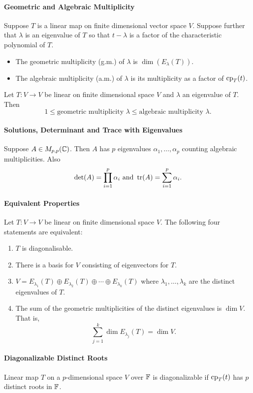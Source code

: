 \paragraph{Geometric and Algebraic Multiplicity}
Suppose \(T\) is a linear map on finite dimensional vector space \(V\). Suppose further that \(\lambda\) is an eigenvalue of \(T\) so that \(t - \lambda\) is a factor of the characteristic polynomial of \(T\). 
\begin{itemize}
    \item The geometric multiplicity (g.m.) of \(\lambda\) is \(\dim(E_\lambda(T))\).
    \item The algebraic multiplicity (a.m.) of \(\lambda\) is its multiplicity as a factor of \(\mathrm{cp}_T(t)\).
\end{itemize}
Let \(T: V \to V\) be linear on finite dimensional space \(V\) and \(\lambda\) an eigenvalue of \(T\). Then
\[1 \leq \text{geometric multiplicity } \lambda \leq \text{algebraic multiplicity } \lambda.\]

\paragraph{Solutions, Determinant and Trace with Eigenvalues}
Suppose \(A \in M_{p,p}(\mathbb{C})\). Then \(A\) has \(p\) eigenvalues \(\alpha_1, \dots, \alpha_p\) counting algebraic multiplicities. Also
\[\det(A) = \prod_{i=1}^p \alpha_i \text{ and } \tr(A) = \sum_{i=1}^p \alpha_i.\]

\paragraph{Equivalent Properties}
Let \(T: V \to V\) be linear on finite dimensional space \(V\). The following four statements are equivalent:
\begin{enumerate}
    \item \(T\) is diagonalisable.
    \item There is a basis for \(V\) consisting of eigenvectors for \(T\).
    \item \(V = E_{\lambda_1}(T) \oplus E_{\lambda_2}(T) \oplus \cdots \oplus E_{\lambda_k}(T)\) where \(\lambda_1, \dots, \lambda_k\) are the distinct eigenvalues of \(T\).
    \item The sum of the geometric multiplicities of the distinct eigenvalues is \(\dim V\). That is,
    \[\sum_{j=1}^k \dim E_{\lambda_j}(T) = \dim V.\]
\end{enumerate}

\paragraph{Diagonalizable Distinct Roots}
Linear map \(T\) on a \(p\)-dimensional space \(V\) over \(\mathbb{F}\) is diagonalizable if \(\mathrm{cp}_T(t)\) has \(p\) distinct roots in \(\mathbb{F}\).